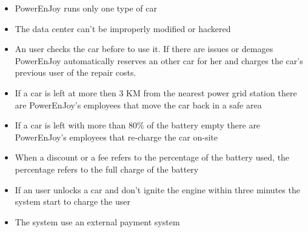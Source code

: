 \begin{itemize}
	\item{PowerEnJoy runs only one type of car}
	\item{The data center can't be improperly modified or hackered}
	\item{An user checks the car before to use it. If there are issues or demages PowerEnJoy automatically reserves an other car for her and charges the car's previous user of the repair costs.}
	\item{If a car is left at more then 3 KM from the nearest power grid station there are PowerEnJoy's employees that move the car back in a \gls{safe area}}
	\item{If a car is left with more than 80\% of the battery empty there are PowerEnJoy's employees that re­‐charge the car on-­site}
	\item{When a discount or a fee refers to the percentage of the battery used, the percentage refers to the full charge of the battery}
	\item{If an user unlocks a car and don't ignite the engine within three minutes the system start to charge the user}%
	\item{The system use an external payment system}
	
\end{itemize}
